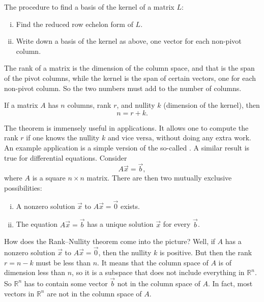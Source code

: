 \pagebreak[2]
The procedure to find a basis of the kernel of a matrix $L$:
\begin{enumerate}[(i)]
\item Find the reduced row echelon form of $L$.
\item Write down a basis of the kernel as above, one vector for each
non-pivot column.
\end{enumerate}


The rank of a matrix is the dimension of the column space, and that is
the span of the pivot columns, while the kernel is the span of certain vectors,
one for each non-pivot column.  So the two numbers must add to the number of
columns.

\begin{theorem}
If a matrix $A$ has $n$ columns, rank $r$, and nullity $k$ (dimension of the
kernel), then
\begin{equation*}
n = r+k .
\end{equation*}
\end{theorem}

The theorem is immensely useful in applications.  It allows one to compute
the rank $r$ if one knows the nullity $k$ and vice versa, without doing any
extra work.
An example application is a simple version of the so-called
\emph{}.  A similar result is true for
differential equations.  Consider
\begin{equation*}
A \vec{x} = \vec{b} ,
\end{equation*}
where $A$ is a square $n \times n$ matrix.
There are then two mutually exclusive possibilities:
\begin{enumerate}[(i)]
\item
A nonzero solution $\vec{x}$ to $A \vec{x} = \vec{0}$ exists.
\item
The equation $A \vec{x} = \vec{b}$ has a unique solution $\vec{x}$ for every
$\vec{b}$.
\end{enumerate}
How does the Rank--Nullity theorem come into the picture?  Well, if $A$ has
a nonzero solution $\vec{x}$ to $A \vec{x} = \vec{0}$, then the nullity $k$ is
positive.  But then the rank $r = n-k$ must be less than $n$.
It means that the column space of $A$ is of dimension less than $n$, so it is
a subspace that does not include everything in ${\mathbb{R}}^n$.
So ${\mathbb{R}}^n$ has to
contain some vector $\vec{b}$ not in the column space of $A$.  In fact, most
vectors in ${\mathbb{R}}^n$ are not in the column space of $A$.



